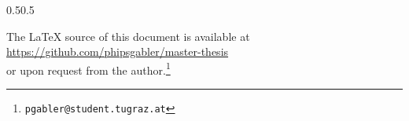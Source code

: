 \begin{adjustwidth}{\absleftindent}{\absrightindent}
  \vspace{2ex}
  
  \begin{adjustwidth}{0.5\absleftindent}{0.5\absrightindent}
    \begin{Center}

      The \LaTeX{} source of this document is available at\\
      \url{https://github.com/phipsgabler/master-thesis} \\
      or upon request from the author.\footnote{\texttt{pgabler@student.tugraz.at}}
    \end{Center}
  \end{adjustwidth}
  

\end{adjustwidth}